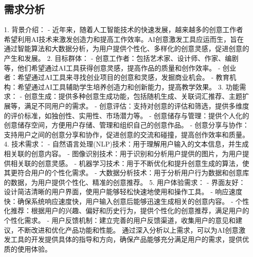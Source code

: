 \subsection{需求分析}
1. 背景介绍：
- 近年来，随着人工智能技术的快速发展，越来越多的创意工作者希望利用AI技术来激发创造力和提高工作效率。AI创意激发工具应运而生，旨在通过智能算法和大数据分析，为用户提供个性化、多样化的创意灵感，促进创意的产生和发展。
2. 目标群体：
- 创意工作者：包括艺术家、设计师、作家、编剧等，他们希望通过AI工具获得创意灵感，提高作品的质量和创作效率。
- 创业者：希望通过AI工具来寻找创业项目的创意和灵感，发掘商业机会。
- 教育机构：希望通过AI工具辅助学生培养创造力和创新能力，提高教学效果。
3. 功能需求：
- 创意生成：提供多种创意生成功能，包括随机生成、关联词汇推荐、主题扩展等，满足不同用户的需求。
- 创意评估：支持对创意的评估和筛选，提供多维度的评价标准，如独创性、实用性、市场潜力等。
- 创意储存与管理：提供个人化的创意储存空间，方便用户存储、管理和组织自己的创意作品。
- 创意分享与协作：支持用户之间的创意分享和协作，促进创意的交流和碰撞，提高创作效率和质量。
4. 技术需求：
- 自然语言处理(NLP)技术：用于理解用户输入的文本信息，并生成相关联的创意内容。
- 图像识别技术：用于识别和分析用户提供的图片，为用户提供相关联的创意灵感。
- 机器学习技术：用于不断优化和提升创意生成的算法，使其更符合用户的个性化需求。
- 大数据分析技术：用于分析用户行为数据和创意库的数据，为用户提供个性化、精准的创意推荐。
5. 用户体验需求：
- 界面友好：设计简洁清晰的用户界面，使用户能够轻松快速地使用和操作工具。
- 响应速度快：确保系统响应速度快，用户输入创意后能够迅速生成相关的创意内容。
- 个性化推荐：根据用户的兴趣、偏好和历史行为，提供个性化的创意推荐，满足用户的个性化需求。
- 用户反馈机制：建立完善的用户反馈渠道，收集用户的意见和建议，不断改进和优化产品功能和性能。
通过深入分析以上需求，可以为AI创意激发工具的开发提供具体的指导和方向，确保产品能够充分满足用户的需求，提供优质的使用体验。
